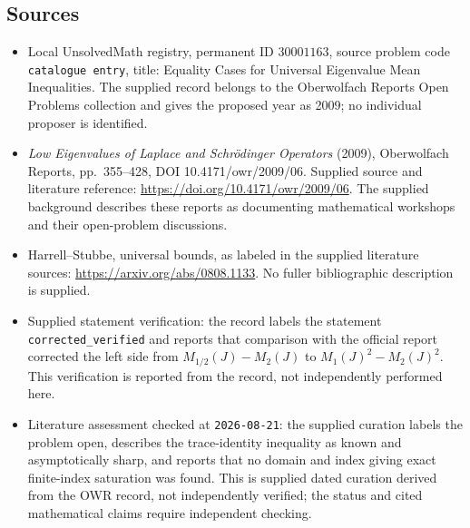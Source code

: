 \documentclass[11pt]{article}
\begin{document}
\subsection{Sources}
\begin{itemize}
\item Local UnsolvedMath registry, permanent ID \(30001163\), source problem code \texttt{catalogue entry}, title: Equality Cases for Universal Eigenvalue Mean Inequalities. The supplied record belongs to the Oberwolfach Reports Open Problems collection and gives the proposed year as 2009; no individual proposer is identified.
\item \emph{Low Eigenvalues of Laplace and Schrödinger Operators} (2009), Oberwolfach Reports, pp.\ 355--428, DOI 10.4171/owr/2009/06. Supplied source and literature reference: \url{https://doi.org/10.4171/owr/2009/06}. The supplied background describes these reports as documenting mathematical workshops and their open-problem discussions.
\item Harrell--Stubbe, universal bounds, as labeled in the supplied literature sources: \url{https://arxiv.org/abs/0808.1133}. No fuller bibliographic description is supplied.
\item Supplied statement verification: the record labels the statement \texttt{corrected\_verified} and reports that comparison with the official report corrected the left side from \(M_{1/2}(J)-M_2(J)\) to \(M_1(J)^2-M_2(J)^2\). This verification is reported from the record, not independently performed here.
\item Literature assessment checked at \texttt{2026-08-21}: the supplied curation labels the problem open, describes the trace-identity inequality as known and asymptotically sharp, and reports that no domain and index giving exact finite-index saturation was found. This is supplied dated curation derived from the OWR record, not independently verified; the status and cited mathematical claims require independent checking.
\end{itemize}
\end{document}
